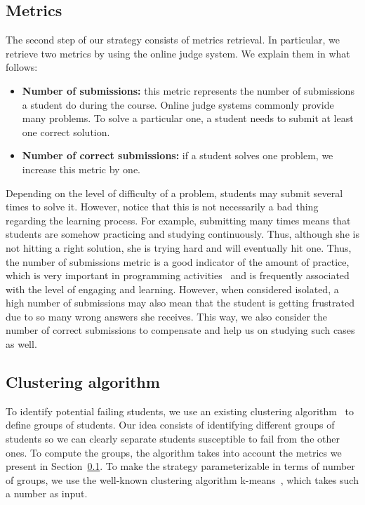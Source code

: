 \subsection{Metrics}

\label{sec:metrics}

The second step of our strategy consists of metrics retrieval. In particular, we retrieve two metrics by using the online judge system. We explain them in what follows:

\begin{itemize}

	\item \textbf{Number of submissions:} this metric represents the number of submissions a student do during the course. Online judge systems commonly provide many problems. To solve a particular one, a student needs to submit at least one correct solution.

	\item \textbf{Number of correct submissions:} if a student solves one problem, we increase this metric by one.

\end{itemize}

Depending on the level of difficulty of a problem, students may submit several times to solve it. However, notice that this is not necessarily a bad thing regarding the learning process. For example, submitting many times means that students are somehow practicing and studying continuously. Thus, although she is not hitting a right solution, she is trying hard and will eventually hit one. Thus, the number of submissions metric is a good indicator of the amount of practice, which is very important in programming activities~\cite{cheang-online-judge-2003} and is frequently associated with the level of engaging and learning. However, when considered isolated, a high number of submissions may also mean that the student is getting frustrated due to so many wrong answers she receives. This way, we also consider the number of correct submissions to compensate and help us on studying such cases as well.


\subsection{Clustering algorithm}

To identify potential failing students, we use an existing clustering algorithm~\cite{hartigan-clustering-algorithms-1975} to define groups of students. Our idea consists of identifying different groups of students so we can clearly separate students susceptible to fail from the other ones. To compute the groups, the algorithm takes into account the metrics we present in Section~\ref{sec:metrics}. To make the strategy parameterizable in terms of number of groups, we use the well-known clustering algorithm k-means~\cite{k-means-1979}, which takes such a number as input.

